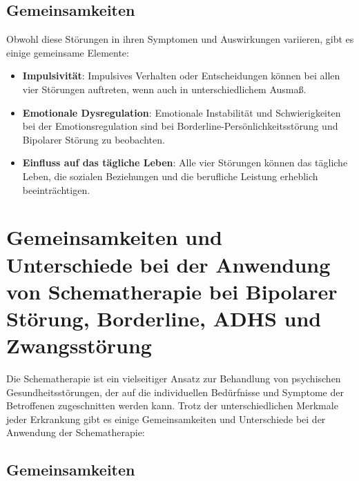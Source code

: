\subsection{Gemeinsamkeiten}

Obwohl diese Störungen in ihren Symptomen und Auswirkungen variieren, gibt es einige gemeinsame Elemente:

\begin{itemize}
\item \textbf{Impulsivität}: Impulsives Verhalten oder Entscheidungen können bei allen vier Störungen auftreten, wenn auch in unterschiedlichem Ausmaß.

\item \textbf{Emotionale Dysregulation}: Emotionale Instabilität und Schwierigkeiten bei der Emotionsregulation sind bei Borderline-Persönlichkeitsstörung und Bipolarer Störung zu beobachten.

\item \textbf{Einfluss auf das tägliche Leben}: Alle vier Störungen können das tägliche Leben, die sozialen Beziehungen und die berufliche Leistung erheblich beeinträchtigen.
\end{itemize}


\section{Gemeinsamkeiten und Unterschiede bei der Anwendung von Schematherapie bei Bipolarer Störung, Borderline, ADHS und Zwangsstörung}

Die Schematherapie ist ein vielseitiger Ansatz zur Behandlung von psychischen Gesundheitsstörungen, der auf die individuellen Bedürfnisse und Symptome der Betroffenen zugeschnitten werden kann. Trotz der unterschiedlichen Merkmale jeder Erkrankung gibt es einige Gemeinsamkeiten und Unterschiede bei der Anwendung der Schematherapie:

\subsection{Gemeinsamkeiten}

